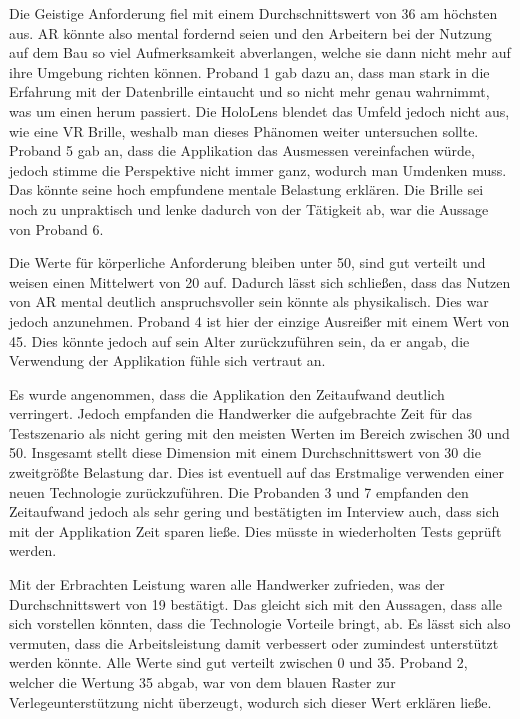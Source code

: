 Die Geistige Anforderung fiel mit einem Durchschnittswert von 36 am höchsten aus. AR könnte also mental fordernd seien und den Arbeitern bei der Nutzung auf dem Bau so viel Aufmerksamkeit abverlangen, welche sie dann nicht mehr auf ihre Umgebung richten können. Proband 1 gab dazu an, dass man stark in die Erfahrung mit der Datenbrille eintaucht und so nicht mehr genau wahrnimmt, was um einen herum passiert. Die HoloLens blendet das Umfeld jedoch nicht aus, wie eine VR Brille, weshalb man dieses Phänomen weiter untersuchen sollte. Proband 5 gab an, dass die Applikation das Ausmessen vereinfachen würde, jedoch stimme die Perspektive nicht immer ganz, wodurch man Umdenken muss. Das könnte seine hoch empfundene mentale Belastung erklären. Die Brille sei noch zu unpraktisch und lenke dadurch von der Tätigkeit ab, war die Aussage von Proband 6.

Die Werte für körperliche Anforderung bleiben unter 50, sind gut verteilt und weisen einen Mittelwert von 20 auf. Dadurch lässt sich schließen, dass das Nutzen von AR mental deutlich anspruchsvoller sein könnte als physikalisch. Dies war jedoch anzunehmen. Proband 4 ist hier der einzige Ausreißer mit einem Wert von 45. Dies könnte jedoch auf sein Alter zurückzuführen sein, da er angab, die Verwendung der Applikation fühle sich vertraut an.

Es wurde angenommen, dass die Applikation den Zeitaufwand deutlich verringert. Jedoch empfanden die Handwerker die aufgebrachte Zeit für das Testszenario als nicht gering mit den meisten Werten im Bereich zwischen 30 und 50. Insgesamt stellt diese Dimension mit einem Durchschnittswert von 30 die zweitgrößte Belastung dar. Dies ist eventuell auf das Erstmalige verwenden einer neuen Technologie zurückzuführen. Die Probanden 3 und 7 empfanden den Zeitaufwand jedoch als sehr gering und bestätigten im Interview auch, dass sich mit der Applikation Zeit sparen ließe. Dies müsste in wiederholten Tests geprüft werden.

Mit der Erbrachten Leistung waren alle Handwerker zufrieden, was der Durchschnittswert von 19 bestätigt. Das gleicht sich mit den Aussagen, dass alle sich vorstellen könnten, dass die Technologie Vorteile bringt, ab. Es lässt sich also vermuten, dass die Arbeitsleistung damit verbessert oder zumindest unterstützt werden könnte. Alle Werte sind gut verteilt zwischen 0 und 35. Proband 2, welcher die Wertung 35 abgab, war von dem blauen Raster zur Verlegeunterstützung nicht überzeugt, wodurch sich dieser Wert erklären ließe.

